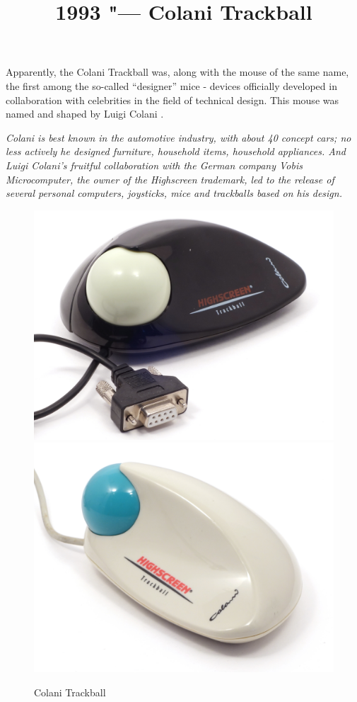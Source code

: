 \documentclass[11pt, a4paper]{article}
\begin{document}
\title{1993 "--- Colani Trackball}
\date{}
\maketitle

Apparently, the  Colani Trackball was, along with the mouse of the same name, the first among the so-called “designer” mice - devices officially developed in collaboration with celebrities in the field of technical design. This mouse was named and shaped by Luigi Colani \cite{wiki}.

\textit{Colani is best known in the automotive industry, with about 40 concept cars; no less actively he designed furniture, household items, household appliances. And Luigi Colani's fruitful collaboration with the German company Vobis Microcomputer, the owner of the Highscreen trademark, led to the release of several personal computers, joysticks, mice and trackballs based on his design.}

\begin{figure}[h]
    \centering
    \includegraphics[scale=0.46]{1993_colani_trackball/pic_b_60.jpg}
    \includegraphics[scale=0.46]{1993_colani_trackball/pic_w_60.jpg}
    \caption{Colani Trackball}
    \label{fig:ColaniPic}
\end{figure}
\end{document}
